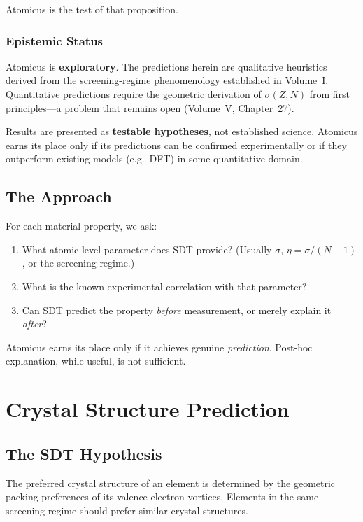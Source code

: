 \documentclass[12pt,a4paper]{report}
\begin{document}
Atomicus is the test of that proposition.

\subsection{Epistemic Status}

Atomicus is \textbf{exploratory}. The predictions herein are qualitative heuristics derived from the screening-regime phenomenology established in Volume~I. Quantitative predictions require the geometric derivation of $\sigma(Z, N)$ from first principles---a problem that remains open (Volume~V, Chapter~27).

Results are presented as \textbf{testable hypotheses}, not established science. Atomicus earns its place only if its predictions can be confirmed experimentally or if they outperform existing models (e.g.\ DFT) in some quantitative domain.

\section{The Approach}

For each material property, we ask:
\begin{enumerate}
  \item What atomic-level parameter does SDT provide? (Usually $\sigma$, $\eta = \sigma/(N{-}1)$, or the screening regime.)
  \item What is the known experimental correlation with that parameter?
  \item Can SDT predict the property \emph{before} measurement, or merely explain it \emph{after}?
\end{enumerate}

Atomicus earns its place only if it achieves genuine \emph{prediction}. Post-hoc explanation, while useful, is not sufficient.


\chapter{Crystal Structure Prediction}
\label{ch:crystal}

\section{The SDT Hypothesis}

The preferred crystal structure of an element is determined by the geometric packing preferences of its valence electron vortices. Elements in the same screening regime should prefer similar crystal structures.
\end{document}
